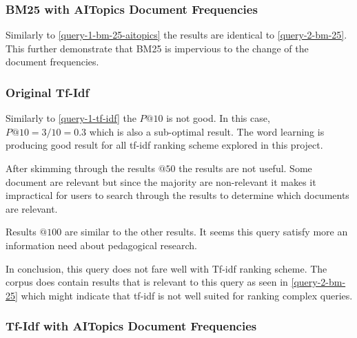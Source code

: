 \subsubsection{BM25 with AITopics Document Frequencies}\label{query-2-bm-25-aitopics}

\par Similarly to \ref{query-1-bm-25-aitopics} the results are identical to \ref{query-2-bm-25}. This further demonstrate that BM25 is impervious to the change of the document frequencies.

\subsubsection{Original Tf-Idf}\label{query-2-tf-idf}

\par Similarly to \ref{query-1-tf-idf} the $P@10$ is not good. In this case, $P@10=3/10=0.3$ which is also a sub-optimal result. The word learning is producing good result for all tf-idf ranking scheme explored in this project.
\par After skimming through the results $@50$ the results are not useful. Some document are relevant but since the majority are non-relevant it makes it impractical for users to search through the results to determine which documents are relevant.
\par Results $@100$ are similar to the other results. It seems this query satisfy more an information need about pedagogical research.
\par In conclusion, this query does not fare well with Tf-idf ranking scheme. The corpus does contain results that is relevant to this query as seen in \ref{query-2-bm-25} which might indicate that tf-idf is not well suited for ranking complex queries.

\subsubsection{Tf-Idf with AITopics Document Frequencies}\label{query-2-tf-idf-aitopics}

